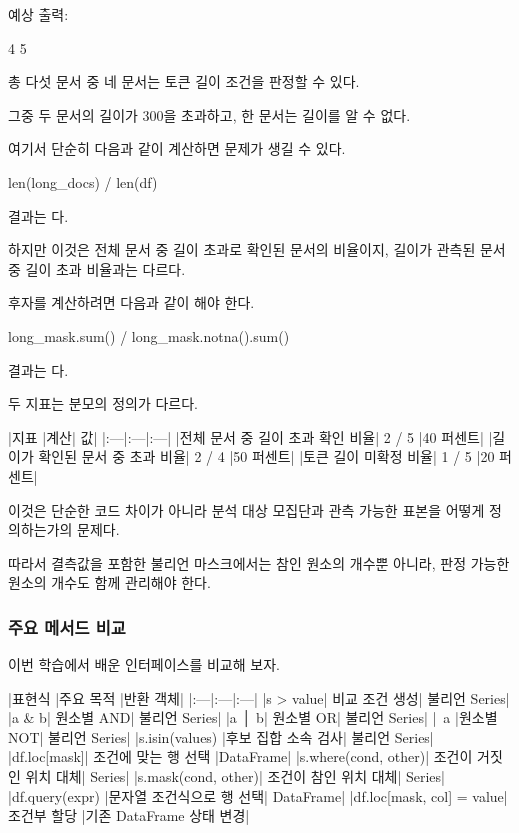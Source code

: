 예상 출력:

\begin{dhkzsh}
['d2', 'd5']
['d3']
4
5
\end{dhkzsh}

총 다섯 문서 중 네 문서는 토큰 길이 조건을 판정할 수 있다.

그중 두 문서의 길이가 300을 초과하고, 한 문서는 길이를 알 수 없다.

여기서 단순히 다음과 같이 계산하면 문제가 생길 수 있다.

\begin{dhkcode}
len(long_docs) / len(df)
\end{dhkcode}

결과는 다.

하지만 이것은 전체 문서 중 길이 초과로 확인된 문서의 비율이지, 길이가 관측된 문서 중 길이 초과 비율과는 다르다.

후자를 계산하려면 다음과 같이 해야 한다.

\begin{dhkcode}
long_mask.sum() / long_mask.notna().sum()
\end{dhkcode}

결과는 다.

두 지표는 분모의 정의가 다르다.

\begin{dhktable}
|지표	|계산|	값|
|:---|:---|:---|
|전체 문서 중 길이 초과 확인 비율|	2 / 5	|40 퍼센트|
|길이가 확인된 문서 중 초과 비율|	2 / 4	|50 퍼센트|
|토큰 길이 미확정 비율|	1 / 5	|20 퍼센트|
\end{dhktable}

이것은 단순한 코드 차이가 아니라 분석 대상 모집단과 관측 가능한 표본을 어떻게 정의하는가의 문제다.

따라서 결측값을 포함한 불리언 마스크에서는 참인 원소의 개수뿐 아니라, 판정 가능한 원소의 개수도 함께 관리해야 한다.

\subsubsection{주요 메서드 비교}

이번 학습에서 배운 인터페이스를 비교해 보자.

\begin{dhktable}
|표현식	|주요 목적	|반환 객체|
|:---|:---|:---|
|s > value|	비교 조건 생성|	불리언 Series|
|a & b|	원소별 AND|	불리언 Series|
|a │ b|	원소별 OR|	불리언 Series|
|~a	|원소별 NOT|	불리언 Series|
|s.isin(values)	|후보 집합 소속 검사|	불리언 Series|
|df.loc[mask]|	조건에 맞는 행 선택	|DataFrame|
|s.where(cond, other)|	조건이 거짓인 위치 대체|	Series|
|s.mask(cond, other)|	조건이 참인 위치 대체|	Series|
|df.query(expr)	|문자열 조건식으로 행 선택|	DataFrame|
|df.loc[mask, col] = value|	조건부 할당	|기존 DataFrame 상태 변경|
\end{dhktable}

